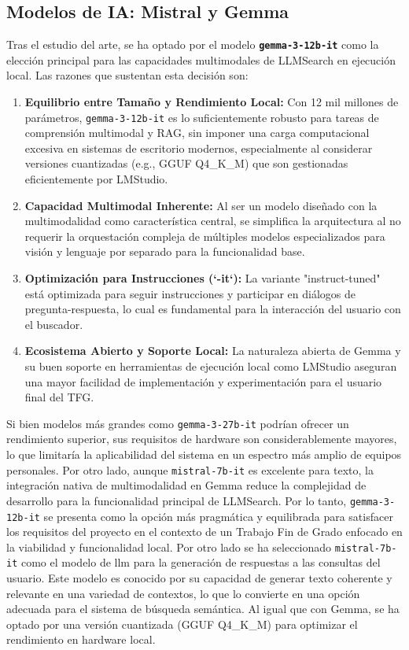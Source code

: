 \subsection{Modelos de IA: Mistral y Gemma}
\label{subsec:decision_models}
Tras el estudio del arte, se ha optado por el modelo \textbf{\texttt{gemma-3-12b-it}} como la elección principal para las capacidades multimodales de LLMSearch en ejecución local. Las razones que sustentan esta decisión son:

\begin{enumerate}
    \item \textbf{Equilibrio entre Tamaño y Rendimiento Local:} Con 12 mil millones de parámetros, \texttt{gemma-3-12b-it} es lo suficientemente robusto para tareas de comprensión multimodal y RAG, sin imponer una carga computacional excesiva en sistemas de escritorio modernos, especialmente al considerar versiones cuantizadas (e.g., GGUF Q4\_K\_M) que son gestionadas eficientemente por LMStudio.
    \item \textbf{Capacidad Multimodal Inherente:} Al ser un modelo diseñado con la multimodalidad como característica central, se simplifica la arquitectura al no requerir la orquestación compleja de múltiples modelos especializados para visión y lenguaje por separado para la funcionalidad base.
    \item \textbf{Optimización para Instrucciones (`-it`):} La variante "instruct-tuned" está optimizada para seguir instrucciones y participar en diálogos de pregunta-respuesta, lo cual es fundamental para la interacción del usuario con el buscador.
    \item \textbf{Ecosistema Abierto y Soporte Local:} La naturaleza abierta de Gemma y su buen soporte en herramientas de ejecución local como LMStudio aseguran una mayor facilidad de implementación y experimentación para el usuario final del TFG.
\end{enumerate}

Si bien modelos más grandes como \texttt{gemma-3-27b-it} podrían ofrecer un rendimiento superior, sus requisitos de hardware son considerablemente mayores, lo que limitaría la aplicabilidad del sistema en un espectro más amplio de equipos personales. Por otro lado, aunque \texttt{mistral-7b-it} es excelente para texto, la integración nativa de multimodalidad en Gemma reduce la complejidad de desarrollo para la funcionalidad principal de LLMSearch. Por lo tanto, \texttt{gemma-3-12b-it} se presenta como la opción más pragmática y equilibrada para satisfacer los requisitos del proyecto en el contexto de un Trabajo Fin de Grado enfocado en la viabilidad y funcionalidad local.
Por otro lado se ha seleccionado \texttt{mistral-7b-it} como el modelo de \gls{llm} para la generación de respuestas a las consultas del usuario. Este modelo es conocido por su capacidad de generar texto coherente y relevante en una variedad de contextos, lo que lo convierte en una opción adecuada para el sistema de búsqueda semántica. Al igual que con Gemma, se ha optado por una versión cuantizada (GGUF Q4\_K\_M) para optimizar el rendimiento en hardware local.

